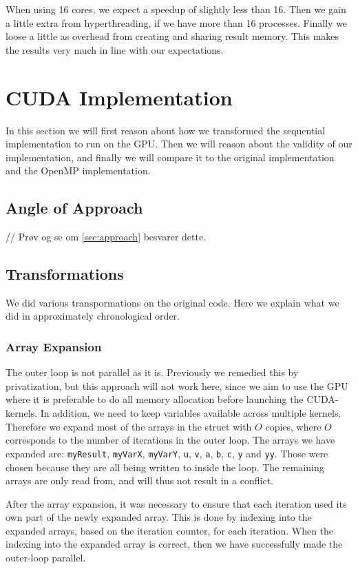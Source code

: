 \documentclass[11pt]{article}
\begin{document}
When using 16 cores, we expect a speedup of slightly less than 16. Then we 
gain a little extra from hyperthreading, if we have more than 16 processes. 
Finally we loose a little as overhead from creating and sharing result memory.
This makes the results very much in line with our expectations.


\section{CUDA Implementation}
In this section we will first reason about how we transformed the sequential
implementation to run on the GPU. Then we will reason about the validity of 
our implementation, and finally we will compare it to the original 
implementation and the OpenMP implementation.

\subsection{Angle of Approach}
// Prøv og se om \autoref{sec:approach} besvarer dette.

\subsection{Transformations}
We did various transpormations on the original code. Here we explain what we 
did in approximately chronological order.

\subsubsection{Array Expansion}
The outer loop is not parallel as it is. Previously we remedied this by privatization,
but this approach will not work here, since we aim to use the GPU where
it is preferable to do all memory allocation before launching the CUDA-kernels.
In addition, we need to keep variables available across multiple kernels. Therefore we
expand most of the arrays in the struct with $O$ copies, where $O$ corresponds to
the number of iterations in the outer loop. The arrays we have expanded are:
\texttt{myResult}, \texttt{myVarX}, \texttt{myVarY}, \texttt{u}, \texttt{v}, \texttt{a}, \texttt{b}, \texttt{c}, \texttt{y} and \texttt{yy}. Those were chosen because 
they are all being written to inside the loop. The remaining arrays are only 
read from, and will thus not result in a conflict. 

After the array expansion,
it was necessary to ensure that each iteration used its own part of the newly
expanded array. This is done by indexing into the expanded arrays, based on the
iteration counter, for each iteration. When the indexing into the expanded
array is correct, then we have successfully made the outer-loop parallel.
\end{document}
